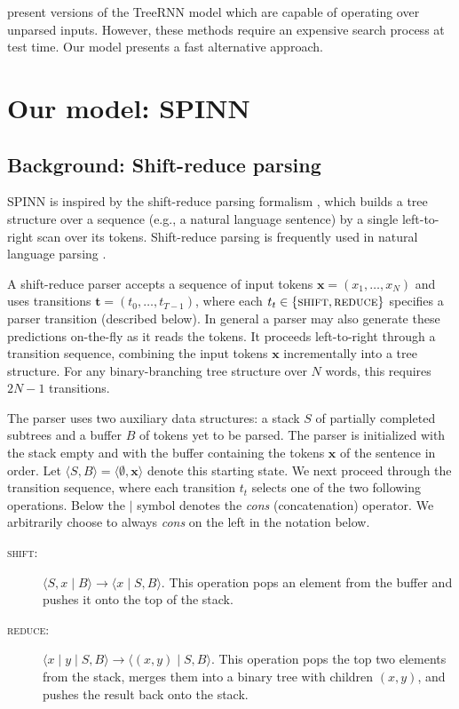 \documentclass[11pt]{article}
\newcommand{\shift}{\textsc{shift}}
\newcommand{\reduce}{\textsc{reduce}}
\begin{document}
\citet{socher2011parsing,socher2011semi} present versions of the TreeRNN model which are capable of operating over unparsed inputs. However, these methods require an expensive search process at test time. Our model presents a fast alternative approach.

\section{Our model: SPINN}

\subsection{Background: Shift-reduce parsing}

SPINN is inspired by the shift-reduce parsing formalism \citep{aho1972theory}, which builds a tree structure over a sequence (e.g., a natural language sentence) by a single left-to-right scan over its tokens. Shift-reduce parsing is frequently used in natural language parsing \citep[e.g.,][]{nivre2003efficient}.

A shift-reduce parser accepts a sequence of input tokens $\mathbf x = (x_1, \dots, x_N)$ and uses transitions $\mathbf t = (t_0, \dots, t_{T-1})$, where each $t_t \in \{\shift, \reduce\}$ specifies a parser transition (described below). In general a parser may also generate these predictions on-the-fly as it reads the tokens. It proceeds left-to-right through a transition sequence, combining the input tokens $\mathbf x$ incrementally into a tree structure. For any binary-branching tree structure over $N$ words, this requires $2N - 1$ transitions.

The parser uses two auxiliary data structures: a stack $S$ of partially completed subtrees and a buffer $B$ of tokens yet to be parsed. The parser is initialized with the stack empty and with the buffer containing the tokens $\mathbf x$ of the sentence in order. Let $\langle S, B \rangle = \langle \emptyset, \mathbf x \rangle$ denote this starting state. We next proceed through the transition sequence, where each transition $t_t$ selects one of the two following operations. Below the $\mid$ symbol denotes the \textit{cons} (concatenation) operator. We arbitrarily choose to always \textit{cons} on the left in the notation below.
\begin{description}
  \item[\shift:] $\langle S, x \mid B \rangle \to \langle x \mid S, B \rangle$. This operation pops an element from the buffer and pushes it onto the top of the stack.
  \item[\reduce:] $\langle x \mid y \mid S, B \rangle \to \langle (x, y) \mid S, B \rangle$. This operation pops the top two elements from the stack, merges them into a binary tree with children $(x, y)$, and pushes the result back onto the stack.
\end{description}
\end{document}
